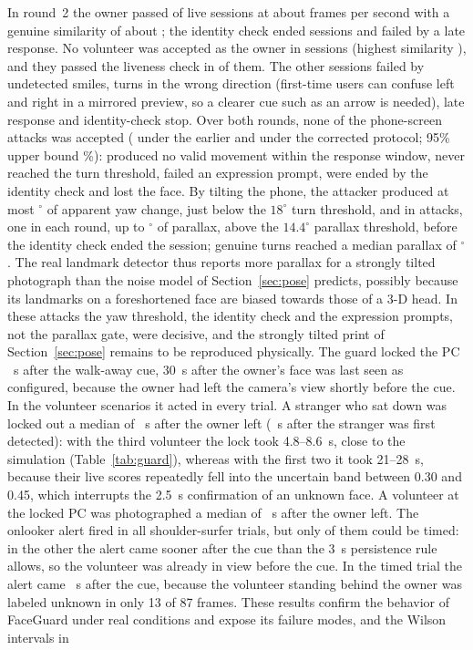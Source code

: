\documentclass[journal]{IEEEtran}
\newcommand{\sys}{FaceGuard}
\begin{document}
In round~2 the owner passed \rwOwnerPass{} of \rwOwnerN{} live sessions at about \rwFps{} frames per second with a genuine similarity of about \rwOwnerSim; the identity check ended \rwOwnerFailIdent{} sessions and \rwOwnerFailLate{} failed by a late response. No volunteer was accepted as the owner in \rwVolN{} sessions (highest similarity \rwVolSim), and they passed the liveness check in \rwVolLive{} of them. The other sessions failed by \rwVolFailSmile{} undetected smiles, \rwVolFailWrong{} turns in the wrong direction (first-time users can confuse left and right in a mirrored preview, so a clearer cue such as an arrow is needed), \rwVolFailLate{} late response and \rwVolFailIdent{} identity-check stop. Over both rounds, none of the \rwAllAttN{} phone-screen attacks was accepted (\rwRoundOneAttN{} under the earlier and \rwAttN{} under the corrected protocol; 95\% upper bound \rwAllAttUpper\%): \rwAttNoResp{} produced no valid movement within the response window, \rwAttTurnTO{} never reached the turn threshold, \rwAttExprTO{} failed an expression prompt, \rwAttIdent{} were ended by the identity check and \rwAttLost{} lost the face. By tilting the phone, the attacker produced at most \rwAllAttYawMax$^\circ$ of apparent yaw change, just below the $18^\circ$ turn threshold, and in \rwAttOverPar{} attacks, one in each round, up to \rwAllAttParMax$^\circ$ of parallax, above the $14.4^\circ$ parallax threshold, before the identity check ended the session; genuine turns reached a median parallax of \rwOwnerParMed$^\circ$. The real landmark detector thus reports more parallax for a strongly tilted photograph than the noise model of Section~\ref{sec:pose} predicts, possibly because its landmarks on a foreshortened face are biased towards those of a 3-D head. In these attacks the yaw threshold, the identity check and the expression prompts, not the parallax gate, were decisive, and the strongly tilted print of Section~\ref{sec:pose} remains to be reproduced physically. The guard locked the PC \rwWalkBeep~s after the walk-away cue, 30~s after the owner's face was last seen as configured, because the owner had left the camera's view shortly before the cue. In the volunteer scenarios it acted in every trial. A stranger who sat down was locked out a median of \rwIntrBeep~s after the owner left (\rwIntrLat~s after the stranger was first detected): with the third volunteer the lock took 4.8--8.6~s, close to the simulation (Table~\ref{tab:guard}), whereas with the first two it took 21--28~s, because their live scores repeatedly fell into the uncertain band between 0.30 and 0.45, which interrupts the 2.5~s confirmation of an unknown face. A volunteer at the locked PC was photographed a median of \rwLockwBeep~s after the owner left. The onlooker alert fired in all \rwShldN{} shoulder-surfer trials, but only \rwShldTimed{} of them could be timed: in the other \rwShldUntimed{} the alert came sooner after the cue than the 3~s persistence rule allows, so the volunteer was already in view before the cue. In the timed trial the alert came \rwShldBeep~s after the cue, because the volunteer standing behind the owner was labeled unknown in only 13 of 87 frames. These results confirm the behavior of \sys{} under real conditions and expose its failure modes, and the Wilson intervals in 
\end{document}
